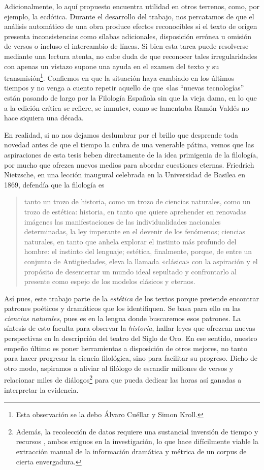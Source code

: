 Adicionalmente, lo aquí propuesto encuentra utilidad en otros terrenos, como, por ejemplo, la ecdótica. Durante el desarrollo del trabajo, nos percatamos de que el análisis automático de una obra produce efectos reconocibles si el texto de origen presenta inconsistencias como sílabas adicionales, disposición errónea u omisión de versos o incluso el intercambio de líneas. Si bien esta tarea puede resolverse  mediante una lectura atenta, no cabe duda de que reconocer tales irregularidades con apenas un vistazo supone una ayuda en el examen del texto y su transmisión\footnote{Esta observación se la debo Álvaro Cuéllar y Simon Kroll.}. Confiemos en que la situación haya cambiado en los últimos tiempos y no venga a cuento repetir aquello de que «las ``nuevas tecnologías'' están pasando de largo por la Filología Española sin que la vieja dama, en lo que a la edición crítica se refiere, se inmute», como se lamentaba Ramón Valdés \parencite*[i]{valdes2014} no hace siquiera una década.

En realidad, si no nos dejamos deslumbrar por el brillo que desprende toda novedad antes de que el tiempo la cubra de una venerable pátina, vemos que las aspiraciones de esta tesis beben directamente de la idea primigenia de la filología, por mucho que ofrezca nuevos medios para abordar cuestiones eternas. Friedrich Nietzsche, en una lección inaugural celebrada en la Universidad de Basilea en 1869, defendía que la filología es

\blockquote{tanto un trozo de historia, como un trozo de ciencias naturales, como un trozo de estética: historia, en tanto que quiere aprehender en renovadas imágenes las manifestaciones de las individualidades nacionales determinadas, la ley imperante en el devenir de los fenómenos; ciencias naturales, en tanto que anhela explorar el instinto más profundo del hombre: el instinto del lenguaje; estética, finalmente, porque, de entre un conjunto de Antigüedades, eleva la llamada «clásica» con la aspiración y el propósito de  desenterrar un mundo ideal sepultado y confrontarlo al presente como espejo de los modelos clásicos y eternos. \parencite*[pp. 249-250; traducción propia]{nietzsche1982}} 

Así pues, este trabajo parte de la \textit{estética} de los textos porque pretende encontrar patrones poéticos y dramáticos que los identifiquen. Se basa para ello en las \textit{ciencias naturales}, pues es en la lengua donde buscaremos esos patrones. La síntesis de esto faculta para observar la \textit{historia}, hallar leyes que ofrezcan nuevas perspectivas en la descripción del teatro del Siglo de Oro. En ese sentido, nuestro empeño último es poner herramientas a disposición de otros mejores, no tanto para hacer progresar la ciencia filológica, sino para facilitar su progreso. Dicho de otro modo, aspiramos a aliviar al filólogo de escandir millones de versos y relacionar miles de diálogos\footnote{Además, la recolección de datos requiere una sustancial inversión de tiempo y recursos \parencite[41]{ehrlicher2019}, ambos exiguos en la investigación, lo que hace difícilmente viable la extracción manual de la información dramática y métrica de un corpus de cierta envergadura.} para que pueda dedicar las horas así ganadas a interpretar la evidencia.

